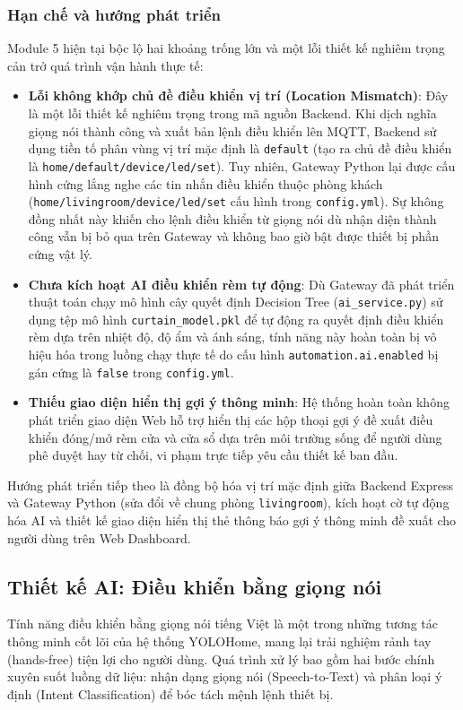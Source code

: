 \subsubsection{Hạn chế và hướng phát triển}
Module 5 hiện tại bộc lộ hai khoảng trống lớn và một lỗi thiết kế nghiêm trọng cản trở quá trình vận hành thực tế:
\begin{itemize}
    \item \textbf{Lỗi không khớp chủ đề điều khiển vị trí (Location Mismatch)}: Đây là một lỗi thiết kế nghiêm trọng trong mã nguồn Backend. Khi dịch nghĩa giọng nói thành công và xuất bản lệnh điều khiển lên MQTT, Backend sử dụng tiền tố phân vùng vị trí mặc định là \texttt{default} (tạo ra chủ đề điều khiển là \texttt{home/default/device/led/set}). Tuy nhiên, Gateway Python lại được cấu hình cứng lắng nghe các tin nhắn điều khiển thuộc phòng khách (\texttt{home/livingroom/device/led/set} cấu hình trong \texttt{config.yml}). Sự không đồng nhất này khiến cho lệnh điều khiển từ giọng nói dù nhận diện thành công vẫn bị bỏ qua trên Gateway và không bao giờ bật được thiết bị phần cứng vật lý.
    \item \textbf{Chưa kích hoạt AI điều khiển rèm tự động}: Dù Gateway đã phát triển thuật toán chạy mô hình cây quyết định Decision Tree (\texttt{ai\_service.py}) sử dụng tệp mô hình \texttt{curtain\_model.pkl} để tự động ra quyết định điều khiển rèm dựa trên nhiệt độ, độ ẩm và ánh sáng, tính năng này hoàn toàn bị vô hiệu hóa trong luồng chạy thực tế do cấu hình \texttt{automation.ai.enabled} bị gán cứng là \texttt{false} trong \texttt{config.yml}.
    \item \textbf{Thiếu giao diện hiển thị gợi ý thông minh}: Hệ thống hoàn toàn không phát triển giao diện Web hỗ trợ hiển thị các hộp thoại gợi ý đề xuất điều khiển đóng/mở rèm cửa và cửa sổ dựa trên môi trường sống để người dùng phê duyệt hay từ chối, vi phạm trực tiếp yêu cầu thiết kế ban đầu.
\end{itemize}
Hướng phát triển tiếp theo là đồng bộ hóa vị trí mặc định giữa Backend Express và Gateway Python (sửa đổi về chung phòng \texttt{livingroom}), kích hoạt cờ tự động hóa AI và thiết kế giao diện hiển thị thẻ thông báo gợi ý thông minh đề xuất cho người dùng trên Web Dashboard.

\subsection{Thiết kế AI: Điều khiển bằng giọng nói}

Tính năng điều khiển bằng giọng nói tiếng Việt là một trong những tương tác thông minh cốt lõi của hệ thống YOLOHome, mang lại trải nghiệm rảnh tay (hands-free) tiện lợi cho người dùng. Quá trình xử lý bao gồm hai bước chính xuyên suốt luồng dữ liệu: nhận dạng giọng nói (Speech-to-Text) và phân loại ý định (Intent Classification) để bóc tách mệnh lệnh thiết bị.


